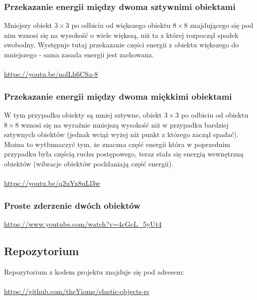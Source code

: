 \documentclass[12pt, letterpaper]{report}
\begin{document}
    \subsubsection{Przekazanie energii między dwoma sztywnimi obiektami}

    Mniejszy obiekt $3 \times 3$ po odbiciu od większego obiektu $8 \times  8$ znajdującego się 
    pod nim wznosi się na
    wysokość o wiele większą, niż ta z której rozpoczął spadek swobodny.
    Występuje tutaj przekazanie części energii z obiektu większego do mniejszego - sama zasada energii jest zachowana.
    \\
    \\
    \url{https://youtu.be/nolLh6CSa-8}

    \subsubsection{Przekazanie energii między dwoma miękkimi obiektami}
    W tym przypadku obiekty są mniej sztywne,
    obiekt $3 \times 3$ po odbiciu od obiektu $8 \times  8$ wznosi się na wyraźnie mniejszą wysokość niż w przypadku bardziej sztywnych obiektów
    (jednak wciąż wyżej niż punkt z którego zaczął spadać). Można to wytłumaczyć tym,
    że znaczna część energii która w poprzednim przypadku była częścią ruchu postępowego,
    teraz stała się energią wewnętrzną obiektów (wibracje obiektów pochłaniają część energii).
    \\
    \\
    \url{https://youtu.be/q2uYx8uLl3w}

    \subsubsection{Proste zderzenie dwóch obiektów}
    \url{https://www.youtube.com/watch?v=4cGcL_5yUt4}

    \subsection{Repozytorium}
    Repozytorium z kodem projektu znajduje się pod adresem:
    \\
    \\
    \url{https://github.com/theYiome/elastic-objects-rs}
\end{document}

